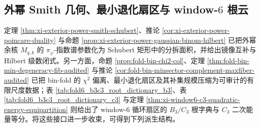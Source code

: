 \subsection{外幂 Smith 几何、最小退化扇区与 window-\texorpdfstring{$6$}{6} 根云}

定理 \ref{thm:xi-exterior-power-smith-schubert}、推论 \ref{cor:xi-exterior-power-poincare-duality} 与命题 \ref{prop:xi-exterior-power-gaussian-binom-hilbert} 已把外幂余核 \(M_{q,k}\) 的 \(\pi_\varphi\)-指数谱参数化为 Schubert 矩形中的分拆面积，并给出镜像互补与 Hilbert 级数闭式。另一方面，命题 \ref{prop:fold-bin-chi2-col}、定理 \ref{thm:fold-bin-min-degeneracy-fib-audited} 与推论 \ref{cor:fold-bin-minsector-complement-maxfiber-audited} 已把 bin-fold 的 \(\chi^2\) 偏离、最小退化扇区及其补集规模压缩为可审计的有限尺度数据；表 \ref{tab:fold6_b3c3_root_dictionary_b3}、表 \ref{tab:fold6_b3c3_root_dictionary_c3} 与定理 \ref{thm:xi-window6-c3-quadratic-energy-equipartition} 则给出了 window-\(6\) 循环扇区的 \(B_3/C_3\) 根字典与 \(C_3\) 二次能量等分。将这些接口进一步收束，可得到下列派生结构。

